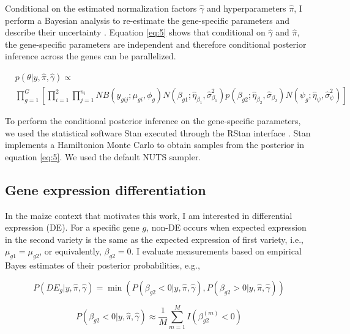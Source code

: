 Conditional on the estimated normalization factors $\hat{\gamma}$ and hyperparameters $\hat{\pi}$, I perform a Bayesian analysis to re-estimate the gene-specific parameters and describe their uncertainty \citep{niemi2015empirical}. Equation \ref{eq:5} shows that conditional on $\hat{\gamma}$ and $\hat{\pi}$, the gene-specific parameters are independent and therefore conditional posterior inference across the genes can be parallelized. 

\begin{equation}
\label{eq:5}
\begin{split}
& p(\theta | y, \hat{\pi}, \hat{\gamma})  \propto \\ & \prod_{g=1}^{G} \left[ \prod_{i=1}^{2} \prod_{j=1}^{n_i} NB(y_{gij} ; \mu_{gi}, \phi_g) N(\beta_{g1} ; \hat{\eta}_{\beta_1}, \hat{\sigma}^2_{\beta_1}) p(\beta_{g2} ; \hat{\eta}_{\beta_2}, \hat{\sigma}_{\beta_2}) N(\psi_g ; \hat{\eta}_{\psi}, \hat{\sigma}^2_{\psi})  \right]
\end{split}
\end{equation}

To perform the conditional posterior inference on the gene-specific parameters, we used the statistical software Stan \citep{stan2014stan} executed through the RStan interface \citep{team2016rstan}. Stan implements a Hamiltonion Monte Carlo \citep{neal2011mcmc} to obtain samples from the posterior in equation \ref{eq:5}. We used the default NUTS sampler\citep{annis2017bayesian}.


\subsection{Gene expression differentiation}

In the maize context that motivates this work, I am interested in differential expression (DE). For a specific gene $g$, non-DE occurs when expected expression in the second variety is the same as the expected expression of first variety, i.e., $\mu_{g1} = \mu_{g2}$, or equivalently, $\beta_{g2}=0$.  I evaluate measurements based on empirical Bayes estimates of their posterior probabilities, e.g., 

\begin{equation}
\label{eq:6}
P(DE_g | y, \hat{\pi}, \hat{\gamma}) =\min( P(\beta_{g2}< 0 | y, \hat{\pi}, \hat{\gamma}),  P(\beta_{g2}> 0 | y, \hat{\pi}, \hat{\gamma}))
\end{equation}

$$P(\beta_{g2}< 0 | y, \hat{\pi}, \hat{\gamma}) \approx \frac{1}{M} \sum_{m=1}^M I(\beta_{g2} ^ {(m)} < 0)$$

